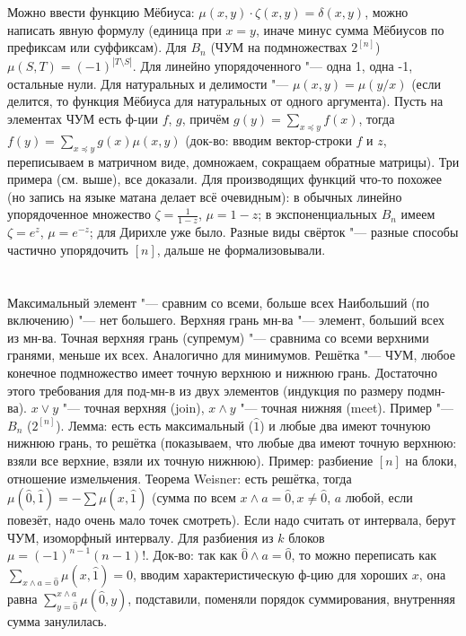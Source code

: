 Можно ввести функцию Мёбиуса: $\mu(x,y)\cdot \zeta(x, y) = \delta(x, y)$, можно написать явную формулу (единица при $x=y$, иначе минус сумма Мёбиусов
по префиксам или суффиксам).
Для $B_n$ (ЧУМ на подмножествах $2^{[n]}$) $\mu(S, T)=(-1)^{|T\setminus S|}$.
Для линейно упорядоченного "--- одна 1, одна -1, остальные нули.
Для натуральных и делимости "--- $\mu(x,y)=\mu(y/x)$ (если делится, то функция Мёбиуса для натуральных от одного аргумента).
Пусть на элементах ЧУМ есть ф-ции $f$, $g$, причём $g(y)=\sum_{x\preccurlyeq y} f(x)$, тогда $f(y)=\sum_{x\preccurlyeq y} g(x)\mu(x, y)$
(док-во: вводим вектор-строки $f$ и $z$, переписываем в матричном виде, домножаем, сокращаем обратные матрицы).
Три примера (см. выше), все доказали.
Для производящих функций что-то похожее (но запись на языке матана делает всё очевидным): в обычных линейно упорядоченное множество $\zeta=\frac{1}{1-z}$, $\mu=1-z$;
в экспоненциальных $B_n$ имеем $\zeta=e^z$, $\mu=e^{-z}$; для Дирихле уже было.
Разные виды свёрток "--- разные способы частично упорядочить $[n]$, дальше не формализовывали.

\section{} %
Максимальный элемент "--- сравним со всеми, больше всех
Наибольший (по включению) "--- нет большего.
Верхняя грань мн-ва "--- элемент, больший всех из мн-ва.
Точная верхняя грань (супремум) "--- сравнима со всеми верхними гранями, меньше их всех.
Аналогично для минимумов.
Решётка "--- ЧУМ, любое конечное подмножество имеет точную верхнюю и нижнюю грань.
Достаточно этого требования для под-мн-в из двух элементов (индукция по размеру подмн-ва).
$x\vee y$ "--- точная верхняя (join), $x \wedge y$ "--- точная нижняя (meet).
Пример "--- $B_n$ ($2^{[n]}$).
Лемма: есть есть максимальный ($\hat 1$) и любые два имеют точнуюю нижнюю грань, то решётка
(показываем, что любые два имеют точную верхнюю: взяли все верхние, взяли их точную нижнюю).
Пример: разбиение $[n]$ на блоки, отношение измельчения.
Теорема Weisner: есть решётка, тогда $\mu(\hat 0, \hat 1)=-\sum \mu(x, \hat 1)$ (сумма по всем $x\wedge a = \hat 0, x \neq \hat 0$,
$a$ любой, если повезёт, надо очень мало точек смотреть).
Если надо считать от интервала, берут ЧУМ, изоморфный интервалу.
Для разбиения из $k$ блоков $\mu=(-1)^{n-1}(n-1)!$.
Док-во: так как $\hat 0 \wedge a = \hat 0$, то можно переписать как $\sum_{x\wedge a = \hat 0} \mu(x, \hat 1) = 0$,
вводим характеристическую ф-цию для хороших $x$, она равна $\sum_{y=\hat 0}^{x\wedge a} \mu(\hat 0, y)$,
подставили, поменяли порядок суммирования, внутренняя сумма занулилась.

